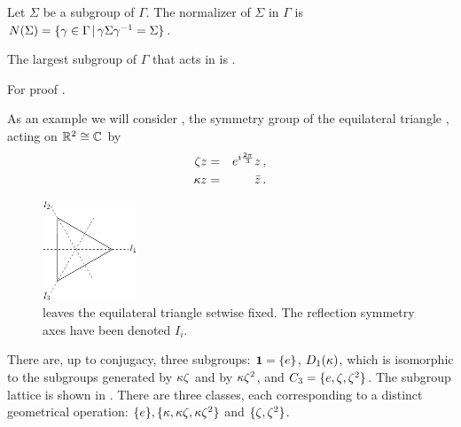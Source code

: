 \begin{definition}
 Let $\Sigma$ be a subgroup of $\Gamma$. The normalizer of $\Sigma$ in $\Gamma$ is
 $N(\Sigma)=\{\gamma\in\Gamma\, |\, \gamma\Sigma\gamma^{-1}=\Sigma\}$.
\end{definition}

\begin{lemma}
  The largest subgroup of $\Gamma$ that acts in \Fix{\Sigma} is \Nlz{\Sigma}.
\end{lemma}
For proof \cf {}.



\begin{example} %
As an example we will consider , the symmetry group of the equilateral triangle
, acting on $\mathbb{R}^{2}\cong\mathbb{C}^{}$ by
\begin{eqnarray*}
  \zeta z &=& e^{i\frac{2\pi}{3}} z\,,\\
  \kappa z  &=& \bar{z}\,.
	\label{eq:D3onR2}
\end{eqnarray*}

\begin{figure}
\begin{center}
		\includegraphics[width=0.25\textwidth]{../figs/D3triangle}
\end{center}
\caption[D3 symmetry illustration.]{
    {\small
     leaves the equilateral triangle setwise fixed. The reflection symmetry axes have been denoted $I_i$.}}
\label{fig:D3triangle}
    \vspace*{-5pt}
\end{figure}

There are, up to conjugacy, three subgroups: $\mathbf{1}=\{e\}$, $D_1(\kappa)$,
which is isomorphic to the subgroups generated
by $\kappa\zeta$ and by $\kappa\zeta^2$, and $C_{3}=\{e,\zeta,\zeta^2\}$.
The subgroup lattice is shown in .
There are three classes, each corresponding to
a distinct geometrical operation: $\{e\},\{\kappa,\kappa\zeta,\kappa\zeta^2\}$
and $\{\zeta,\zeta^2\}$.


\end{example}


